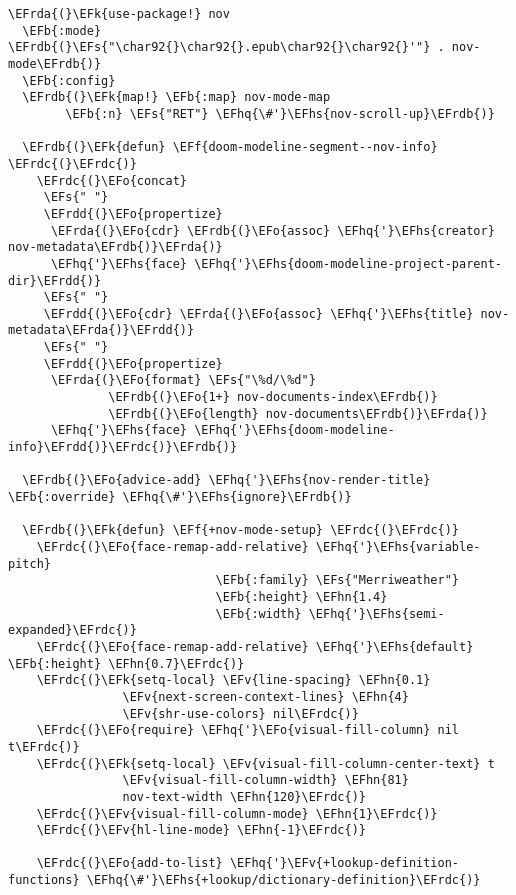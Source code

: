 \documentclass[a4wide,10pt]{article}
\newcommand{\EFs}[1]{\textcolor{EFs}{#1}} %
\newcommand{\EFk}[1]{\textcolor{EFk}{#1}} %
\newcommand{\EFb}[1]{\textcolor{EFb}{#1}} %
\newcommand{\EFf}[1]{\textcolor{EFf}{#1}} %
\newcommand{\EFv}[1]{\textcolor{EFv}{#1}} %
\newcommand{\EFo}[1]{\textcolor{EFo}{#1}} %
\newcommand{\EFhn}[1]{\textcolor{EFhn}{\textbf{#1}}} %
\newcommand{\EFhq}[1]{\textcolor{EFhq}{#1}} %
\newcommand{\EFhs}[1]{\textcolor{EFhs}{#1}} %
\newcommand{\EFrda}[1]{\textcolor{EFrda}{#1}} %
\newcommand{\EFrdb}[1]{\textcolor{EFrdb}{#1}} %
\newcommand{\EFrdc}[1]{\textcolor{EFrdc}{#1}} %
\newcommand{\EFrdd}[1]{\textcolor{EFrdd}{#1}} %
\begin{document}
\begin{Code}
\begin{Verbatim}
\EFrda{(}\EFk{use-package!} nov
  \EFb{:mode} \EFrdb{(}\EFs{"\char92{}\char92{}.epub\char92{}\char92{}'"} . nov-mode\EFrdb{)}
  \EFb{:config}
  \EFrdb{(}\EFk{map!} \EFb{:map} nov-mode-map
        \EFb{:n} \EFs{"RET"} \EFhq{\#'}\EFhs{nov-scroll-up}\EFrdb{)}

  \EFrdb{(}\EFk{defun} \EFf{doom-modeline-segment--nov-info} \EFrdc{(}\EFrdc{)}
    \EFrdc{(}\EFo{concat}
     \EFs{" "}
     \EFrdd{(}\EFo{propertize}
      \EFrda{(}\EFo{cdr} \EFrdb{(}\EFo{assoc} \EFhq{'}\EFhs{creator} nov-metadata\EFrdb{)}\EFrda{)}
      \EFhq{'}\EFhs{face} \EFhq{'}\EFhs{doom-modeline-project-parent-dir}\EFrdd{)}
     \EFs{" "}
     \EFrdd{(}\EFo{cdr} \EFrda{(}\EFo{assoc} \EFhq{'}\EFhs{title} nov-metadata\EFrda{)}\EFrdd{)}
     \EFs{" "}
     \EFrdd{(}\EFo{propertize}
      \EFrda{(}\EFo{format} \EFs{"\%d/\%d"}
              \EFrdb{(}\EFo{1+} nov-documents-index\EFrdb{)}
              \EFrdb{(}\EFo{length} nov-documents\EFrdb{)}\EFrda{)}
      \EFhq{'}\EFhs{face} \EFhq{'}\EFhs{doom-modeline-info}\EFrdd{)}\EFrdc{)}\EFrdb{)}

  \EFrdb{(}\EFo{advice-add} \EFhq{'}\EFhs{nov-render-title} \EFb{:override} \EFhq{\#'}\EFhs{ignore}\EFrdb{)}

  \EFrdb{(}\EFk{defun} \EFf{+nov-mode-setup} \EFrdc{(}\EFrdc{)}
    \EFrdc{(}\EFo{face-remap-add-relative} \EFhq{'}\EFhs{variable-pitch}
                             \EFb{:family} \EFs{"Merriweather"}
                             \EFb{:height} \EFhn{1.4}
                             \EFb{:width} \EFhq{'}\EFhs{semi-expanded}\EFrdc{)}
    \EFrdc{(}\EFo{face-remap-add-relative} \EFhq{'}\EFhs{default} \EFb{:height} \EFhn{0.7}\EFrdc{)}
    \EFrdc{(}\EFk{setq-local} \EFv{line-spacing} \EFhn{0.1}
                \EFv{next-screen-context-lines} \EFhn{4}
                \EFv{shr-use-colors} nil\EFrdc{)}
    \EFrdc{(}\EFo{require} \EFhq{'}\EFo{visual-fill-column} nil t\EFrdc{)}
    \EFrdc{(}\EFk{setq-local} \EFv{visual-fill-column-center-text} t
                \EFv{visual-fill-column-width} \EFhn{81}
                nov-text-width \EFhn{120}\EFrdc{)}
    \EFrdc{(}\EFv{visual-fill-column-mode} \EFhn{1}\EFrdc{)}
    \EFrdc{(}\EFv{hl-line-mode} \EFhn{-1}\EFrdc{)}

    \EFrdc{(}\EFo{add-to-list} \EFhq{'}\EFv{+lookup-definition-functions} \EFhq{\#'}\EFhs{+lookup/dictionary-definition}\EFrdc{)}


\end{Verbatim}
\end{Code}
\end{document}
